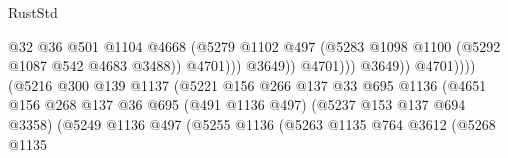 \begin{lexlean}{RustStd}
\begin{coremodule}
{\begin{coremodule}
{{{{{{{{{{{{{{                                                              @32
                                                              @36
                                                              @501
                                                              @1104
                                                              @4668
                                                              (@5279
                                                                @1102
                                                                @497
                                                                (@5283
                                                                  @1098
                                                                  @1100
                                                                  (@5292 @1087 @542 @4683 @3488))
                                                                @4701)))
                                                          @3649))
                                                      @4701)))
                                                @3649))
                                            @4701))))
                                    (@5216
                                      @300
                                      @139
                                      @1137
                                      (@5221
                                        @156
                                        @266
                                        @137
                                        @33
                                        @695
                                        @1136
                                        (@4651
                                          @156
                                          @268
                                          @137
                                          @36
                                          @695
                                          (@491 @1136 @497)
                                          (@5237 @153 @137 @694 @3358)
                                          (@5249
                                            @1136
                                            @497
                                            (@5255
                                              @1136
                                              (@5263
                                                @1135
                                                @764
                                                @3612
                                                (@5268
                                                  @1135
}}}}}}}}}}}}}}
\end{coremodule}}
\end{coremodule}
\end{lexlean}
